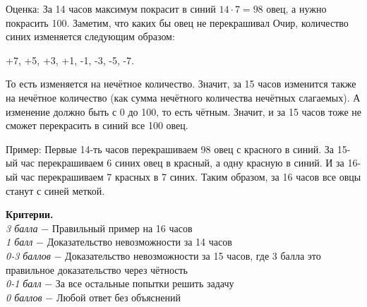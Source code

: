  Оценка: За 14 часов максимум покрасит в синий $14\cdot7=98$ овец, а нужно покрасить 100. Заметим, что каких бы овец не перекрашивал Очир, количество синих изменяется следующим образом:

+7, +5, +3, +1, -1, -3, -5, -7. 

То есть изменяется на нечётное количество. Значит, за 15 часов изменится также на нечётное количество (как сумма нечётного количества нечётных слагаемых). А изменение должно быть с 0 до 100, то есть чётным. Значит, и за 15 часов тоже не сможет перекрасить в синий все 100 овец. 

Пример: Первые 14-ть часов перекрашиваем 98 овец с красного в синий. За 15-ый час перекрашиваем 6 синих овец в красный, а одну красную в синий. И за 16-ый час перекрашиваем 7 красных в 7 синих. Таким образом, за 16 часов все овцы станут с синей меткой.\par

\textbf{Критерии.} \\
\textit{3 балла} $-$ Правильный пример на 16 часов\\
\textit{1 балл} $-$ Доказательство невозможности за 14 часов\\
\textit{0-3 баллов} $-$ Доказательство невозможности за 15 часов, где 3 балла это правильное доказательство через чётность\\
\textit{0-1 балл} $-$  За все остальные попытки решить задачу\\ 
\textit{0 баллов} $-$ Любой ответ без объяснений\\

